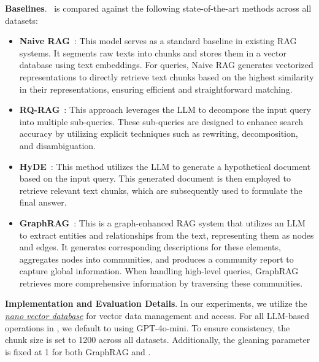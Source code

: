 \textbf{Baselines}.  \model\ is compared against the following state-of-the-art methods across all datasets:
\begin{itemize}[leftmargin=*]
    \item \textbf{Naive RAG}~\citep{gao2023retrieval}: This model serves as a standard baseline in existing RAG systems. It segments raw texts into chunks and stores them in a vector database using text embeddings. For queries, Naive RAG generates vectorized representations to directly retrieve text chunks based on the highest similarity in their representations, ensuring efficient and straightforward matching.
    
    \item \textbf{RQ-RAG}~\citep{chan2024rq}: This approach leverages the LLM to decompose the input query into multiple sub-queries. These sub-queries are designed to enhance search accuracy by utilizing explicit techniques such as rewriting, decomposition, and disambiguation.
    
    \item \textbf{HyDE}~\citep{hyde}: This method utilizes the LLM to generate a hypothetical document based on the input query. This generated document is then employed to retrieve relevant text chunks, which are subsequently used to formulate the final answer.
    
    \item \textbf{GraphRAG}~\citep{edge2024local}: This is a graph-enhanced RAG system that utilizes an LLM to extract entities and relationships from the text, representing them as nodes and edges. It generates corresponding descriptions for these elements, aggregates nodes into communities, and produces a community report to capture global information. When handling high-level queries, GraphRAG retrieves more comprehensive information by traversing these communities.
\end{itemize}

\textbf{Implementation and Evaluation Details}.
In our experiments, we utilize the \href{https://github.com/gusye1234/nano-vectordb}{\textit{nano vector database}} for vector data management and access. For all LLM-based operations in \model, we default to using GPT-4o-mini. To ensure consistency, the chunk size is set to 1200 across all datasets. Additionally, the gleaning parameter is fixed at 1 for both GraphRAG and \model.

